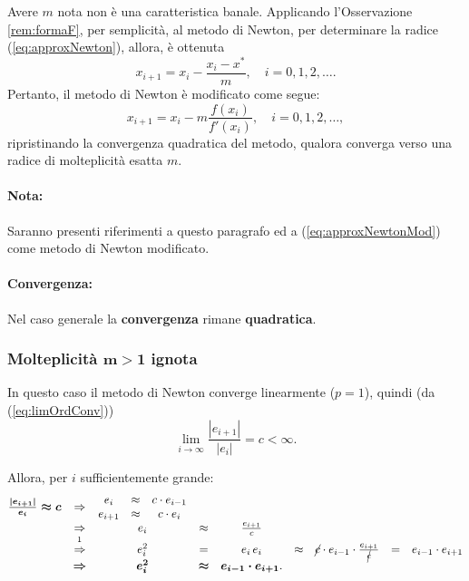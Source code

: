 Avere $m$ nota non è una caratteristica banale. Applicando l'Osservazione \ref{rem:formaF}, per semplicità, al metodo di Newton, per determinare la radice (\ref{eq:approxNewton}), allora, è ottenuta
\begin{equation*}
	x_{i+1}=x_i-\frac{x_i-x^*}{m}, \quad i=0,1,2,\hdots.
\end{equation*}
Pertanto, il metodo di Newton è modificato come segue:
\begin{equation}\label{eq:approxNewtonMod}
	x_{i+1}=x_i-m\frac{f(x_i)}{f'(x_i)}, \quad i=0,1,2,\hdots,
\end{equation}
ripristinando la convergenza quadratica del metodo, qualora converga verso una radice di molteplicità esatta $m$.

\paragraph{Nota:} Saranno presenti riferimenti a questo paragrafo ed a (\ref{eq:approxNewtonMod}) come metodo di Newton modificato.

\paragraph{Convergenza:} Nel caso generale la \textbf{convergenza} rimane \textbf{quadratica}.

\subsubsection{Molteplicità \texorpdfstring{$\boldsymbol{m>1}$}{m>1} ignota}
In questo caso il metodo di Newton converge linearmente ($p=1$), quindi (da (\ref{eq:limOrdConv}))
\begin{equation*}
	\underset{i\to\infty}{\lim}{\frac{|e_{i+1}|}{|e_i|}} = c<\infty.
\end{equation*}

Allora, per $i$ sufficientemente grande:
\begin{equation*}
	\begin{matrix}
		\boldsymbol{\frac{|e_{i+1}|}{e_i}\approx c}&\Rightarrow&
		\begin{matrix}
			e_i &\approx& c\cdot e_{i-1}\\
			e_{i+1}&\approx& c\cdot e_i
		\end{matrix}\\
		&\Rightarrow& e_i &\approx& \frac{e_{i+1}}{c}\\
		&\overset{\footnotemark}{\Rightarrow}& e_i^2&=&e_i\,e_i&\approx&\cancel{c}\cdot e_{i-1}\cdot \frac{e_{i+1}}{\cancel{c}}&=&e_{i-1}\cdot e_{i+1}\\
		&\boldsymbol\Rightarrow&\boldsymbol{e_i^2}&\boldsymbol\approx& \boldsymbol{e_{i-1}\cdot e_{i+1}}.
	\end{matrix}
\end{equation*}

